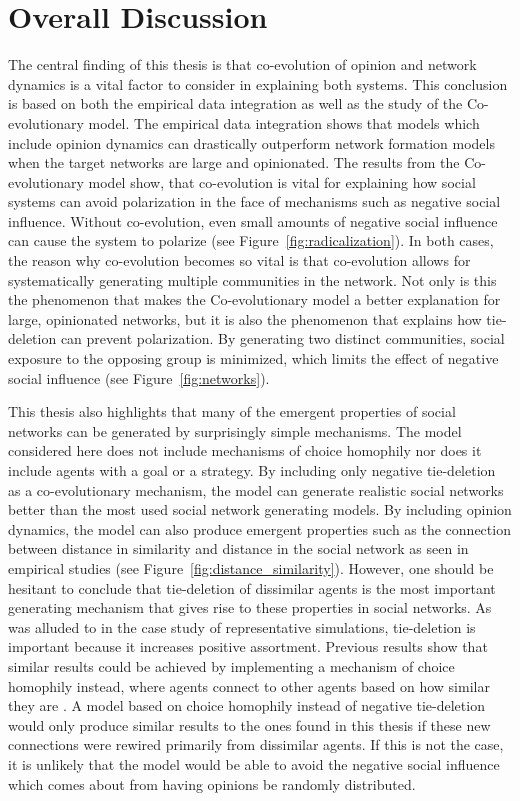 \documentclass[11pt]{article}
\begin{document}
\part{Overall Discussion}
The central finding of this thesis is that co-evolution of opinion and network dynamics is a vital factor to consider in explaining both systems. This conclusion is based on both the empirical data integration as well as the study of the Co-evolutionary model. The empirical data integration shows that models which include opinion dynamics can drastically outperform network formation models when the target networks are large and opinionated. The results from the Co-evolutionary model show, that co-evolution is vital for explaining how social systems can avoid polarization in the face of mechanisms such as negative social influence. Without co-evolution, even small amounts of negative social influence can cause the system to polarize (see Figure~\ref{fig:radicalization}). 
In both cases, the reason why co-evolution becomes so vital is that co-evolution allows for systematically generating multiple communities in the network. Not only is this the phenomenon that makes the Co-evolutionary model a better explanation for large, opinionated networks, but it is also the phenomenon that explains how tie-deletion can prevent polarization. By generating two distinct communities, social exposure to the opposing group is minimized, which limits the effect of negative social influence (see Figure~\ref{fig:networks}).

\noindent This thesis also highlights that many of the emergent properties of social networks can be generated by surprisingly simple mechanisms. The model considered here does not include mechanisms of choice homophily nor does it include agents with a goal or a strategy. By including only negative tie-deletion as a co-evolutionary mechanism, the model can generate realistic social networks better than the most used social network generating models. By including opinion dynamics, the model can also produce emergent properties such as the connection between distance in similarity and distance in the social network as seen in empirical studies \cite{kossinets_origins_2009} (see Figure~\ref{fig:distance_similarity}). However, one should be hesitant to conclude that tie-deletion of dissimilar agents is the most important generating mechanism that gives rise to these properties in social networks. As was alluded to in the case study of representative simulations, tie-deletion is important because it increases positive assortment. Previous results show that similar results could be achieved by implementing a mechanism of choice homophily instead, where agents connect to other agents based on how similar they are \cite{asikainen_cumulative_2020}. A model based on choice homophily instead of negative tie-deletion would only produce similar results to the ones found in this thesis if these new connections were rewired primarily from dissimilar agents. If this is not the case, it is unlikely that the model would be able to avoid the negative social influence which comes about from having opinions be randomly distributed. 
\end{document}
